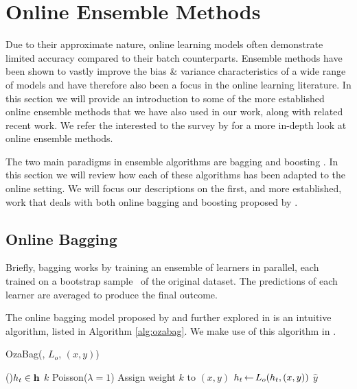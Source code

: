 \section{Online Ensemble Methods}
\label{sec:bg-ol-ensembles}

Due to their approximate nature, online learning models often demonstrate
limited accuracy compared to their batch counterparts. Ensemble methods
have been shown to vastly improve the bias \& variance characteristics
of a wide range of models \cite{ensemble-methods-dietrich} and have therefore
also been a focus in the online learning literature.
In this section we will provide an introduction to some of the more established
online ensemble methods that we have also used in our work, along with related
recent work. We refer the interested to the survey by \citet{online-ensembles-survey}
for a more in-depth look at online ensemble methods.

The two main paradigms in ensemble algorithms are bagging \cite{bagging} and boosting \cite{boosting-freund, boosting-schapire}. In this section we will review how each of these algorithms
has been adapted to the online setting. We will focus our descriptions on the first, and more established,
work that deals with both online bagging and boosting proposed by \citet{Oza2001online}.

\subsection{Online Bagging}

Briefly, bagging works by training an ensemble of learners in parallel,
each trained on a bootstrap sample~\cite{bootstrap} of the original dataset.
The predictions of each learner are averaged to produce the final outcome.

The online bagging model proposed by \citet{Oza2001online} and further explored in
\cite{online-bagging-experiments} is an intuitive algorithm, listed in Algorithm
\ref{alg:ozabag}. We make use of this algorithm in \uncertaintrees.

\begin{algorithm}
	\small
	\caption{OzaBag(\ensemble, $L_o$, $(x,y)$)}
	\label{alg:ozabag}

	\ForEach(){$h_t \in \mathbf{h}$}{
		$k$  Poisson($\lambda = 1$) \;
		Assign weight $k$ to $(x,y)$ \;
		$h_t {\,\leftarrow\,} L_o(h_t, (x,y))$
	}
	\Return $\widehat{y}$ \;
\end{algorithm}


